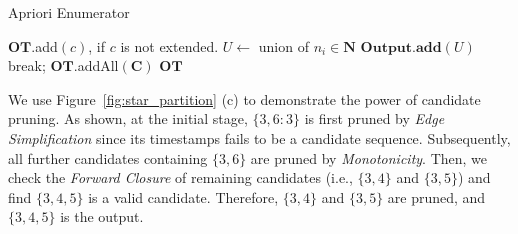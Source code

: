 \begin{algorithm}
\caption{Apriori Enumerator}
\label{algo:apriori_mining}
\begin{algorithmic}[1]
 \label{code:init-start}
 \label{code:simp1}
\label{code:init-prune}
\EndFor\label{code:init-end}
\label{code:init-C}
 \label{code:level-start}
		 \label{code:join-start}
				 \label{code:join}
				 \label{code:mono-pruning}
			\EndFor
			\State $\mathbf{OT}$.add$(c)$, if $c$ is not extended.\label{code:output1}
		\EndFor	\label{code:join-ends}
		\State $U \gets $ union of $n_i \in \mathbf{N}$	\label{code:fc-checking-start}
			\State $\mathbf{Output}.\mathbf{add}(U)$ \label{code:fc-checking}
			\State break;
		\EndIf \label{code:fc-checking-ends}
\EndWhile\label{code:level-ends}
\State $\mathbf{OT}$.addAll$(\mathbf{C})$
\State \Return $\mathbf{OT}$
\end{algorithmic}
\end{algorithm}
 
%

\begin{example}
We use Figure~\ref{fig:star_partition} (c) to 
demonstrate the power of candidate pruning. 
As shown, at the initial stage, $\{3,6:3\}$ is first pruned by \textit{Edge Simplification} since its
timestamps fails to be a candidate sequence. Subsequently, all further candidates containing $\{3,6\}$ 
are pruned by \textit{Monotonicity}. Then, we check the \textit{Forward Closure} 
of remaining candidates (i.e., $\{3,4\}$ and $\{3,5\}$) and find $\{3,4,5\}$ is a
valid candidate. Therefore, $\{3,4\}$ and $\{3,5\}$ are pruned, and $\{3,4,5\}$ is the output.
\end{example}


